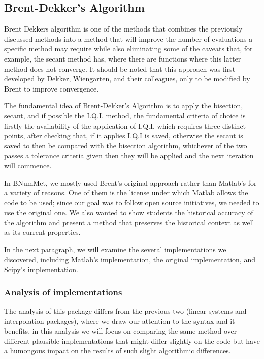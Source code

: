 \subsection{Brent-Dekker's Algorithm}
Brent Dekkers algorithm is one of the methods that combines the previously discussed methods into a method that will improve the number of evaluations a specific method may require while also eliminating some of the caveats that, for example, the secant method has, where there are functions where this latter method does not converge.  It should be noted that this approach was first developed by Dekker, Wiengarten, and their colleagues, only to be modified by Brent to improve convergence. \cite{brent2002algorithms} 

The fundamental idea of Brent-Dekker's Algorithm is to apply the bisection, secant, and if possible the I.Q.I. method, the fundamental criteria of choice is firstly the availability of the application of I.Q.I. which requires three distinct points, after checking that, if it applies I.Q.I is saved, otherwise the secant is saved to then be compared with the bisection algorithm, whichever of the two passes a tolerance criteria given then they will be applied and the next iteration will commence.


In BNumMet, we mostly used Brent's original approach \cite{Press2007} rather than Matlab's for a variety of reasons. One of them is the license under which Matlab allows the code to be used; since our goal was to follow open source initiatives, we needed to use the original one. We also wanted to show students the historical accuracy of the algorithm and present a method that preserves the historical context as well as its current properties. 

In the next paragraph, we will examine the several implementations we discovered, including Matlab's implementation, the original implementation, and Scipy's implementation.

\subsubsection{Analysis of implementations}
The analysis of this package differs from the previous two (linear systems and interpolation packages), where we draw our attention to the syntax and it benefits, in this analysis we will focus on comparing the same method over different plausible implementations that might differ slightly on the code but have a humongous impact on the results of such slight algorithmic differences.

